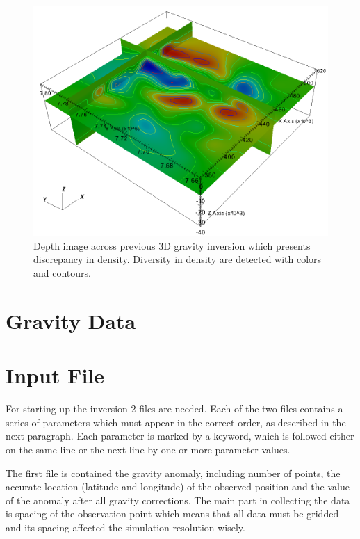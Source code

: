 \begin{figure}
\centering
\includegraphics[width=\textwidth]{density11.png}
\caption{Depth image across previous 3D gravity inversion which presents discrepancy in density. Diversity in density are detected with colors and contours.}
\end{figure}





\section{Gravity Data}





\section{Input File} 

For starting up the inversion 2 files are needed. Each of the 
two files contains a series of parameters which must appear in the correct order, as described in 
the next paragraph. Each parameter is marked by a keyword, which is followed either on the same line 
or the next line by one or more parameter values. 

The first file is contained the gravity anomaly, including number of points, the accurate location
(latitude and longitude) of the observed position and the value of the anomaly after all gravity corrections. 
The main part in collecting the data is spacing of the observation point which means that all data must be gridded and 
its spacing affected the simulation resolution wisely.


